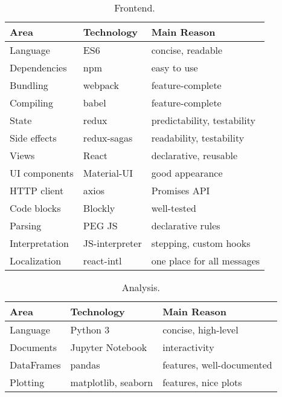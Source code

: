 \begin{table}[htb]
\centering
\caption{Frontend.}
\begin{tabular}{l l l}
\toprule
Area & Technology & Main Reason  \\
\midrule
Language & ES6 & concise, readable \\
Dependencies & npm & easy to use \\
Bundling & webpack & feature-complete \\ %
Compiling & babel & feature-complete \\ %
State & redux  & predictability, testability \\  %
Side effects & redux-sagas  & readability, testability \\
Views & React & declarative, reusable \\
UI components & Material-UI & good appearance \\
HTTP client & axios & Promises API\\
Code blocks & Blockly & well-tested \\
Parsing & PEG JS & declarative rules \\  %
Interpretation & JS-interpreter & stepping, custom hooks \\
Localization & react-intl & one place for all messages \\
\bottomrule
\end{tabular}
\end{table}

\begin{table}[htb]
\centering
\caption{Analysis.}
\begin{tabular}{l l l}
\toprule
Area & Technology & Main Reason  \\
\midrule
Language & Python 3 & concise, high-level \\
Documents & Jupyter Notebook & interactivity \\
DataFrames & pandas & features, well-documented \\
Plotting & matplotlib, seaborn & features, nice plots \\
\bottomrule
\end{tabular}
\end{table}
